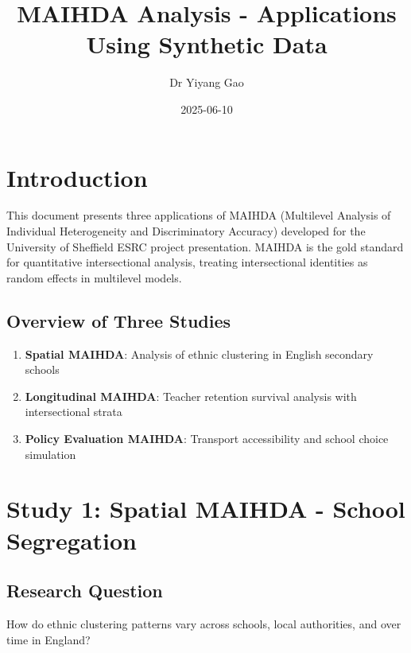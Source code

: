\documentclass[
]{article}
\title{MAIHDA Analysis - Applications Using Synthetic Data}
\author{Dr Yiyang Gao}
\date{2025-06-10}
\providecommand{\tightlist}{%
  \setlength{\itemsep}{0pt}\setlength{\parskip}{0pt}}
\begin{document}
\maketitle

{
\setcounter{tocdepth}{3}
\tableofcontents
}
\hypertarget{introduction}{%
\section{Introduction}\label{introduction}}

This document presents three applications of MAIHDA (Multilevel Analysis
of Individual Heterogeneity and Discriminatory Accuracy) developed for
the University of Sheffield ESRC project presentation. MAIHDA is the
gold standard for quantitative intersectional analysis, treating
intersectional identities as random effects in multilevel models.

\hypertarget{overview-of-three-studies}{%
\subsection{Overview of Three Studies}\label{overview-of-three-studies}}

\begin{enumerate}
\def\labelenumi{\arabic{enumi}.}
\tightlist
\item
  \textbf{Spatial MAIHDA}: Analysis of ethnic clustering in English
  secondary schools
\item
  \textbf{Longitudinal MAIHDA}: Teacher retention survival analysis with
  intersectional strata
\item
  \textbf{Policy Evaluation MAIHDA}: Transport accessibility and school
  choice simulation
\end{enumerate}

\hypertarget{study-1-spatial-maihda---school-segregation}{%
\section{Study 1: Spatial MAIHDA - School
Segregation}\label{study-1-spatial-maihda---school-segregation}}

\hypertarget{research-question}{%
\subsection{Research Question}\label{research-question}}

How do ethnic clustering patterns vary across schools, local
authorities, and over time in England?
\end{document}
